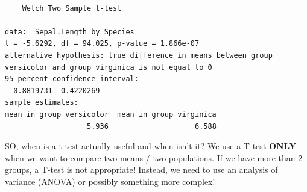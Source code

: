 \documentclass[
  letterpaper,
  DIV=11,
  numbers=noendperiod]{scrartcl}
\begin{document}
\begin{verbatim}

    Welch Two Sample t-test

data:  Sepal.Length by Species
t = -5.6292, df = 94.025, p-value = 1.866e-07
alternative hypothesis: true difference in means between group versicolor and group virginica is not equal to 0
95 percent confidence interval:
 -0.8819731 -0.4220269
sample estimates:
mean in group versicolor  mean in group virginica 
                   5.936                    6.588 
\end{verbatim}

SO, when is a t-test actually useful and when isn't it? We use a T-test
\textbf{ONLY} when we want to compare two means / two populations. If we
have more than 2 groups, a T-test is not appropriate! Instead, we need
to use an analysis of variance (ANOVA) or possibly something more
complex!
\end{document}
